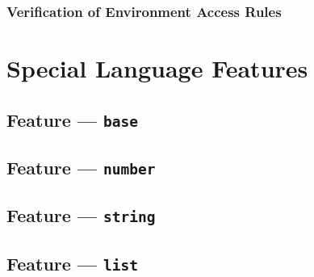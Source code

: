 
\subsubsection{Verification of Environment Access Rules} %
\label{ssub:verification_of_environment_access_rules}




\section{Special Language Features} %
\label{sec:special_language_features}

\subsection{Feature --- \texttt{base}} %
\label{sub:feature_base}


\subsection{Feature --- \texttt{number}} %
\label{sub:feature_number}


\subsection{Feature --- \texttt{string}} %
\label{sub:feature_string}


\subsection{Feature --- \texttt{list}} %
\label{sub:feature_list}

